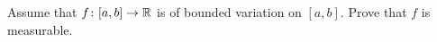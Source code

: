 \begin{problem}
  Assume that \(f\colon[a,b]\to\mathbb{R}\) is of bounded variation on
  \([a,b]\). Prove that \(f\) is measurable.
\end{problem}
\begin{solution}
\end{solution}

